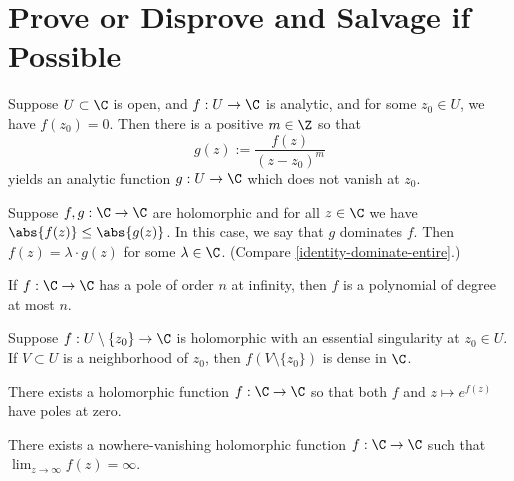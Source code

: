 \documentclass{homework}
\begin{document}
\section{Prove or Disprove and Salvage if Possible}

\begin{problem}\label{factor-theorem}
  Suppose $U \subset \C$ is open, and $f : U \to \C$ is analytic, and for some $z_0 \in U$, we have $f(z_0) = 0$.  Then there is a positive $m \in \Z$ so that
  \[
    g(z) := \frac{f(z)}{(z-z_0)^m}
  \]
  yields an analytic function $g : U \to \C$ which does not vanish at $z_0$.
\end{problem}

\begin{problem}\label{entire-dominate-entire}Suppose $f, g : \C \to \C$ are holomorphic and for all $z \in \C$ we have $\abs{f(z)} \leq \abs{g(z)}$.  In this case, we say that $g$ dominates $f$.  Then $f(z) = \lambda \cdot g(z)$ for some $\lambda \in \C$.  (Compare \ref{identity-dominate-entire}.)
\end{problem}

\begin{problem}
  If $f : \C \to \C$ has a pole of order $n$ at infinity, then $f$ is a polynomial of degree at most $n$.
\end{problem}

\begin{problem}\label{casorati-weierstrass}
  Suppose $f : U \setminus \{ z_0 \} \to \C$ is holomorphic with an essential singularity at $z_0 \in U$.  If $V \subset U$ is a neighborhood of $z_0$, then $f(V \setminus \{ z_0 \})$ is dense in $\C$.
\end{problem}

\begin{problem}
  There exists a holomorphic function $f : \C \to \C$ so that both $f$
  and $z \mapsto e^{f(z)}$ have poles at zero.
\end{problem}

\begin{problem}
  There exists a nowhere-vanishing holomorphic function
  $f : \C \to \C$ such that $\lim_{z \to \infty} f(z) = \infty$.
\end{problem}
\end{document}
